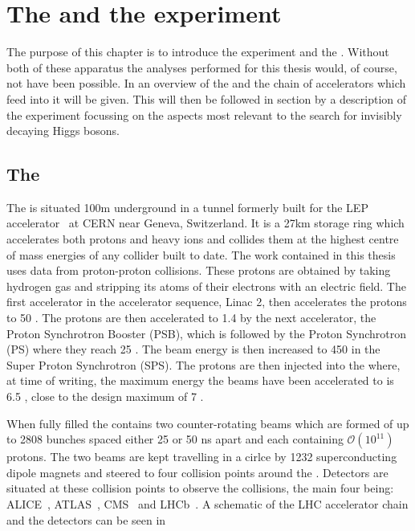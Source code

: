 \chapter{The \LHC and the \CMS experiment}
\label{chap:detector}

The purpose of this chapter is to introduce the \CMS experiment and the \LHC \cite{1748-0221-3-08-S08001}. Without both of these apparatus the analyses performed for this thesis would, of course, not have been possible. In  an overview of the \LHC and the chain of accelerators which feed into it will be given. This will then be followed in section  by a description of the \CMS experiment focussing on the aspects most relevant to the search for invisibly decaying Higgs bosons.

\section{The \LHC}
\label{sec:lhc}
The \LHC is situated 100m underground in a tunnel formerly built for the LEP accelerator~\cite{lepdesign} at CERN near Geneva, Switzerland. It is a 27km storage ring which accelerates both protons and heavy ions and collides them at the highest centre of mass energies of any collider built to date. The work contained in this thesis uses data from proton-proton collisions. These protons are obtained by taking hydrogen gas and stripping its atoms of their electrons with an electric field. The first accelerator in the \LHC accelerator sequence, Linac 2, then accelerates the protons to 50 \MeV. The protons are then accelerated to 1.4 \GeV by the next accelerator, the Proton Synchrotron Booster (PSB), which is followed by the Proton Synchrotron (PS) where they reach 25 \GeV. The beam energy is then increased to 450 \GeV in the Super Proton Synchrotron (SPS). The protons are then injected into the \LHC where, at time of writing, the maximum energy the beams have been accelerated to is 6.5 \TeV, close to the design maximum of 7 \TeV.

When fully filled the \LHC contains two counter-rotating beams which are formed of up to 2808 bunches spaced either 25 or 50 ns apart and each containing $\mathcal{O}(10^{11})$ protons. The two beams are kept travelling in a cirlce by 1232 superconducting dipole magnets and steered to four collision points around the \LHC. Detectors are situated at these collision points to observe the collisions, the main four being: ALICE~\cite{Aamodt:2008zz}, ATLAS~\cite{Aad:1129811}, CMS~\cite{Chatrchyan:2008aa} and LHCb~\cite{Alves:2008zz}. A schematic of the LHC accelerator chain and the detectors can be seen in 

